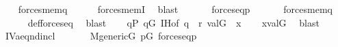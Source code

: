 \begin{isabellebody}
\ \ \isamarkupfalse%
\ {\isachardoublequoteopen}forces{\isacharunderscore}{\kern0pt}mem{\isacharparenleft}{\kern0pt}q{\isacharcomma}{\kern0pt}{\isasymsigma}{\isacharcomma}{\kern0pt}{\isasymtau}{\isacharparenright}{\kern0pt}{\isachardoublequoteclose}\isanewline
\ \ \ \ \isamarkupfalse%
\ forces{\isacharunderscore}{\kern0pt}memI\ \isamarkupfalse%
\ blast\isanewline
\ \ \isamarkupfalse%
\isanewline
\ \ \isamarkupfalse%
\ {\isacartoucheopen}forces{\isacharunderscore}{\kern0pt}eq{\isacharparenleft}{\kern0pt}p{\isacharcomma}{\kern0pt}{\isasymtau}{\isacharcomma}{\kern0pt}{\isasymtheta}{\isacharparenright}{\kern0pt}{\isacartoucheclose}\isanewline
\ \ \isamarkupfalse%
\isanewline
\ \ \isamarkupfalse%
\ {\isachardoublequoteopen}forces{\isacharunderscore}{\kern0pt}mem{\isacharparenleft}{\kern0pt}q{\isacharcomma}{\kern0pt}{\isasymsigma}{\isacharcomma}{\kern0pt}{\isasymtheta}{\isacharparenright}{\kern0pt}{\isachardoublequoteclose}\isanewline
\ \ \ \ \isamarkupfalse%
\ def{\isacharunderscore}{\kern0pt}forces{\isacharunderscore}{\kern0pt}eq\ \isamarkupfalse%
\ blast\isanewline
\ \ \isamarkupfalse%
\ {\isacartoucheopen}q{\isasymin}P{\isacartoucheclose}\ {\isacartoucheopen}q{\isasymin}G{\isacartoucheclose}\ IH{\isacharbrackleft}{\kern0pt}of\ q\ {\isasymsigma}{\isacharbrackright}{\kern0pt}\ {\isacartoucheopen}{\isasymlangle}{\isasymsigma}{\isacharcomma}{\kern0pt}r{\isasymrangle}{\isasymin}{\isasymtau}{\isacartoucheclose}\ {\isacartoucheopen}val{\isacharparenleft}{\kern0pt}G{\isacharcomma}{\kern0pt}{\isasymsigma}{\isacharparenright}{\kern0pt}\ {\isacharequal}{\kern0pt}\ x{\isacartoucheclose}\isanewline
\ \ \isamarkupfalse%
\ {\isachardoublequoteopen}x{\isasymin}val{\isacharparenleft}{\kern0pt}G{\isacharcomma}{\kern0pt}{\isasymtheta}{\isacharparenright}{\kern0pt}{\isachardoublequoteclose}\ \isamarkupfalse%
\ {\isacharparenleft}{\kern0pt}blast{\isacharparenright}{\kern0pt}\isanewline
{}\isamarkupfalse%
%
\endisatagproof
{\isafoldproof}%
%
\isadelimproof
\isanewline
%
\endisadelimproof
\isanewline
\isanewline
{}\isamarkupfalse%
\ IV{}{}{}a{\isacharunderscore}{\kern0pt}eq{\isacharunderscore}{\kern0pt}{}nd{\isacharunderscore}{\kern0pt}incl{\isacharcolon}{\kern0pt}\isanewline
\ \ \isanewline
\ \ \ \ {\isachardoublequoteopen}M{\isacharunderscore}{\kern0pt}generic{\isacharparenleft}{\kern0pt}G{\isacharparenright}{\kern0pt}{\isachardoublequoteclose}\ {\isachardoublequoteopen}p{\isasymin}G{\isachardoublequoteclose}\ {\isachardoublequoteopen}forces{\isacharunderscore}{\kern0pt}eq{\isacharparenleft}{\kern0pt}p{\isacharcomma}{\kern0pt}{\isasymtau}{\isacharcomma}{\kern0pt}{\isasymtheta}{\isacharparenright}{\kern0pt}{\isachardoublequoteclose}\isanewline

\end{isabellebody}
